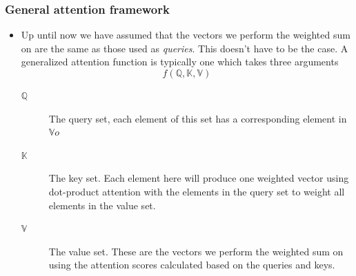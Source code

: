 \documentclass{beamer}
\begin{document}
\begin{frame}
  \frametitle{General attention framework}
  \begin{itemize}
  \item Up until now we have assumed that the vectors we perform the weighted sum on are the same as those used as \emph{queries}. This doesn't have to be the case. A generalized attention function is typically one which takes three arguments
    \[ f(\mathbb{Q}, \mathbb{K}, \mathbb{V}) \]
    \begin{description}
     \item[$\mathbb{Q}$] The query set, each element of this set has a corresponding element in  $\mathbb{V}o$
     \item[$\mathbb{K}$] The key set. Each element here will produce one weighted vector using dot-product attention with the elements in the query set to weight all elements in the value set.
       \item[$\mathbb{V}$] The value set. These are the vectors we perform the weighted sum on using the attention scores calculated based on the queries and keys.
     \end{description}

   \end{itemize}

\end{frame}



\end{document}
